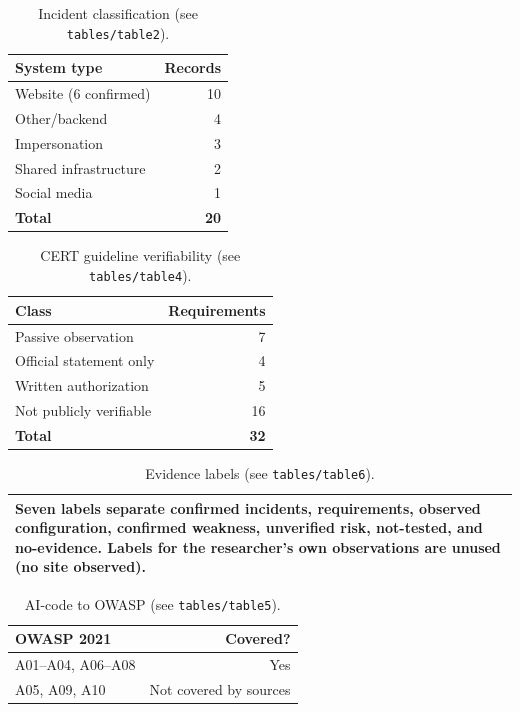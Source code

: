 \documentclass[conference]{IEEEtran}
\begin{document}
\begin{table}[t]\caption{Incident classification (see \texttt{tables/table2}).}\label{tab:incident}
\centering\footnotesize\begin{tabular}{@{}lr@{}}\toprule System type & Records\\\midrule
Website (6 confirmed) & 10\\ Other/backend & 4\\ Impersonation & 3\\ Shared infrastructure & 2\\
Social media & 1\\ \textbf{Total} & \textbf{20}\\\bottomrule\end{tabular}\end{table}

\begin{table}[t]\caption{CERT guideline verifiability (see \texttt{tables/table4}).}\label{tab:cert}
\centering\footnotesize\begin{tabular}{@{}lr@{}}\toprule Class & Requirements\\\midrule
Passive observation & 7\\ Official statement only & 4\\ Written authorization & 5\\
Not publicly verifiable & 16\\ \textbf{Total} & \textbf{32}\\\bottomrule\end{tabular}\end{table}

\begin{table}[t]\caption{Evidence labels (see \texttt{tables/table6}).}\label{tab:evid}
\centering\footnotesize\begin{tabular}{@{}p{}@{}}\toprule
Seven labels separate confirmed incidents, requirements, observed configuration, confirmed
weakness, unverified risk, not-tested, and no-evidence. Labels for the researcher's own
observations are unused (no site observed).\\\bottomrule\end{tabular}\end{table}

\begin{table}[t]\caption{AI-code to OWASP (see \texttt{tables/table5}).}\label{tab:owasp}
\centering\footnotesize\begin{tabular}{@{}lr@{}}\toprule OWASP 2021 & Covered?\\\midrule
A01--A04, A06--A08 & Yes\\ A05, A09, A10 & Not covered by sources\\\bottomrule\end{tabular}\end{table}
\end{document}
